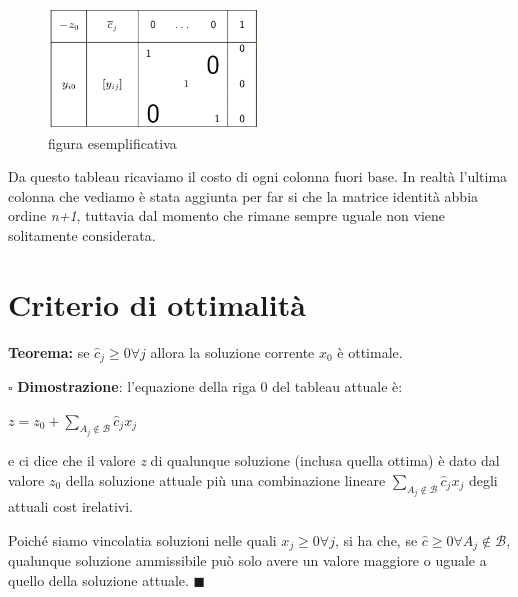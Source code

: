 \documentclass[11pt]{book}
\begin{document}
\begin{figure}[h!]
  \centering
  \includegraphics[width=0.5\textwidth]{images/tableau3.png}
  \caption{figura esemplificativa}
  \label{tableau3}
\end{figure}

Da questo tableau ricaviamo il costo di ogni colonna fuori base. In
realt\`a l'ultima colonna che vediamo \`e stata aggiunta per far si
che la matrice identit\`a abbia ordine {\em n+1}, tuttavia dal momento
che rimane sempre uguale non viene solitamente considerata.

\section{Criterio di ottimalit\`a}

{\bf Teorema:} se $\hat{c}_j \geq 0 \forall j$ allora la soluzione
corrente $x_0$ \`e ottimale.

\vspace{11pt}
$\square$ {\bf Dimostrazione}: l'equazione della riga 0 del tableau
attuale \`e:

\begin{center}
$z = z_0 + \sum\limits_{A_j \not\in \mathcal{B}} \hat{c}_jx_j$  
\end{center}

e ci dice che il valore {\em z} di qualunque soluzione (inclusa quella
ottima) \`e dato dal valore $z_0$ della soluzione attuale pi\`u una
combinazione lineare $\sum\limits_{A_j \not\in \mathcal{B}}
\hat{c}_jx_j$ degli attuali cost irelativi.

Poich\'e siamo vincolatia soluzioni nelle quali $x_j \geq 0 \forall j$,
si ha che, se $\hat{c} \geq 0 \forall A_j \not \in \mathcal{B}$,
qualunque soluzione ammissibile pu\`o solo avere un valore maggiore o
uguale a quello della soluzione attuale. $\blacksquare$
\vspace{11pt}
\end{document}
